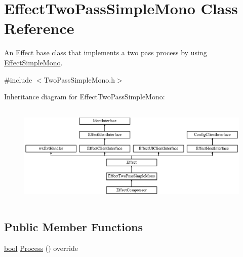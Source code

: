 \hypertarget{class_effect_two_pass_simple_mono}{}\section{Effect\+Two\+Pass\+Simple\+Mono Class Reference}
\label{class_effect_two_pass_simple_mono}


An \hyperlink{class_effect}{Effect} base class that implements a two pass process by using \hyperlink{class_effect_simple_mono}{Effect\+Simple\+Mono}.  




{\ttfamily \#include $<$Two\+Pass\+Simple\+Mono.\+h$>$}

Inheritance diagram for Effect\+Two\+Pass\+Simple\+Mono\+:\begin{figure}[H]
\begin{center}
\leavevmode
\includegraphics[height=4.883721cm]{class_effect_two_pass_simple_mono}
\end{center}
\end{figure}
\subsection*{Public Member Functions}
\begin{DoxyCompactItemize}
\item 
\hyperlink{mac_2config_2i386_2lib-src_2libsoxr_2soxr-config_8h_abb452686968e48b67397da5f97445f5b}{bool} \hyperlink{class_effect_two_pass_simple_mono_aad3b6d98f43b0cd1df87ceba31ac82e3}{Process} () override
\end{DoxyCompactItemize}
